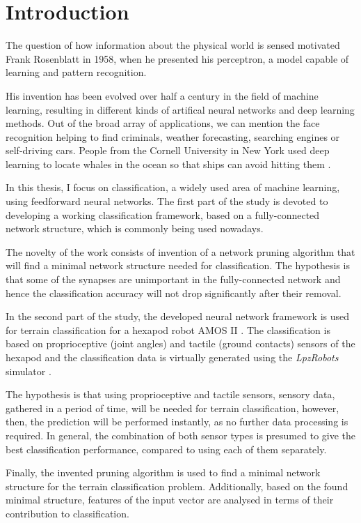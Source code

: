\chapter{Introduction} \label{chap:introduction}
The question of how information about the physical world is sensed motivated Frank Rosenblatt in 1958, when he presented his perceptron, a model capable of learning and pattern recognition. 

His invention has been evolved over half a century in the field of machine learning, resulting in different kinds of artifical neural networks and deep learning methods. Out of the broad array of applications, we can mention the face recognition helping to find criminals, weather forecasting, searching engines or self-driving cars. People from the Cornell University in New York used deep learning to locate whales in the ocean so that ships can avoid hitting them \citep{misc:whales}.    

In this thesis, I focus on classification, a widely used area of machine learning, using feedforward neural networks. The first part of the study is devoted to developing a working classification framework, based on a fully-connected network structure, which is commonly being used nowadays. 

The novelty of the work consists of invention of a network pruning algorithm that will find a minimal network structure needed for classification. The hypothesis is that some of the synapses are unimportant in the fully-connected network and hence the classification accuracy will not drop significantly after their removal.

In the second part of the study, the developed neural network framework is used for terrain classification for a hexapod robot AMOS II \citep{misc:amosii}. The classification is based on proprioceptive (joint angles) and tactile (ground contacts) sensors of the hexapod and the classification data is virtually generated using the \textit{LpzRobots} simulator \citep{misc:lpzrobots}.

The hypothesis is that using proprioceptive and tactile sensors, sensory data, gathered in a period of time, will be needed for terrain classification, however, then, the prediction will be performed instantly, as no further data processing is required. In general, the combination of both sensor types is presumed to give the best classification performance, compared to using each of them separately.

Finally, the invented pruning algorithm is used to find a minimal network structure for the terrain classification problem. Additionally, based on the found minimal structure, features of the input vector are analysed in terms of their contribution to classification.


